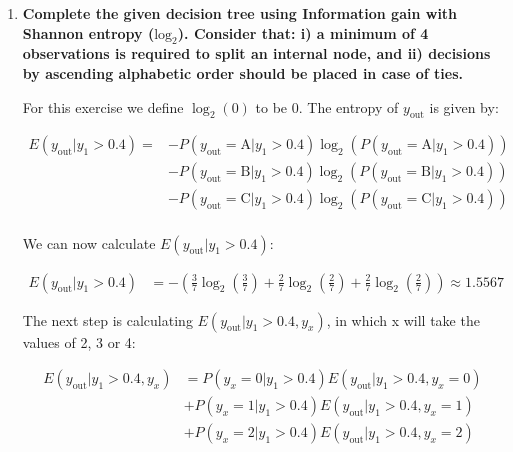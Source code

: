 \documentclass[12pt]{article}
\begin{document}
\begin{enumerate}[leftmargin=\labelsep]
  \item \textbf{Complete the given decision tree using Information gain with Shannon entropy ($\text{log}_2$).
          Consider that: i) a minimum of 4 observations is required to split an internal node, and
          ii) decisions by ascending alphabetic order should be placed in case of ties.}

        \vskip 0.3cm
        For this exercise we define $\log_2\left(0\right)$ to be 0. The entropy of \(y_{\text{out}}\) is given by:

        \begin{equation*}
          \begin{split}
            E(y_{\text{out}} |y_1 > 0.4) =
            & - P(y_{\text{out}} = \text{A}| y_1 > 0.4) \log_2 \left(P(y_{\text{out}} = \text{A}| y_1 > 0.4)\right)      \\
            & - P(y_{\text{out}} = \text{B}| y_1 > 0.4) \log_2 \left(P(y_{\text{out}} = \text{B}| y_1 > 0.4)\right)      \\
            & - P(y_{\text{out}} = \text{C}| y_1 > 0.4) \log_2 \left(P(y_{\text{out}} = \text{C}| y_1 > 0.4)\right)      \\
          \end{split}
        \end{equation*}

        We can now calculate $E(y_{\text{out}} |y_1 > 0.4)$:

        \[
          \begin{aligned}
            E(y_{\text{out}} |y_1 > 0.4) & = - \left(\frac{3}{7} \log_2\left(\frac{3}{7}\right) + \frac{2}{7} \log_2\left(\frac{2}{7}\right)
            + \frac{2}{7} \log_2\left(\frac{2}{7}\right)\right) \approx 1.5567
          \end{aligned}
        \]

        The next step is calculating $E(y_{\text{out}} | y_1 > 0.4 , y_x)$, in which x will take the values of 2, 3 or 4:

        \begin{equation}\label{exI1-e-yout-y2}
          \begin{split}
            E(y_{\text{out}} |y_1 > 0.4 , y_x) & = P(y_x = 0| y_1 > 0.4) E(y_{\text{out}} | y_1 > 0.4 , y_x = 0) \\
            & + P(y_x = 1| y_1 > 0.4) E(y_{\text{out}} | y_1 > 0.4 , y_x = 1) \\
            & + P(y_x = 2| y_1 > 0.4) E(y_{\text{out}} | y_1 > 0.4 , y_x = 2)
          \end{split}
        \end{equation}


\end{enumerate}
\end{document}
